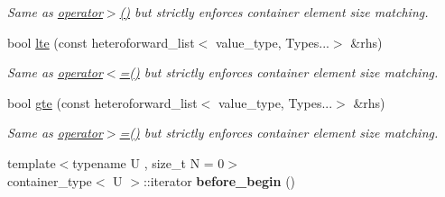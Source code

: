 \begin{DoxyCompactItemize}
\begin{DoxyCompactList}\small\item\em Same as \hyperlink{classheterogeneous_1_1heteroforward__list_3_01_t_00_01_types_8_8_8_4_a53105623b3fa15a69a755abb72d8d9e8}{operator$>$()} but strictly enforces container element size matching. \end{DoxyCompactList}\item 
\hypertarget{classheterogeneous_1_1heteroforward__list_3_01_t_00_01_types_8_8_8_4_a3f428c8009c489894a94a96668958e56}{}bool \hyperlink{classheterogeneous_1_1heteroforward__list_3_01_t_00_01_types_8_8_8_4_a3f428c8009c489894a94a96668958e56}{lte} (const heteroforward\+\_\+list$<$ value\+\_\+type, Types...$>$ \&rhs)\label{classheterogeneous_1_1heteroforward__list_3_01_t_00_01_types_8_8_8_4_a3f428c8009c489894a94a96668958e56}

\begin{DoxyCompactList}\small\item\em Same as \hyperlink{classheterogeneous_1_1heteroforward__list_3_01_t_00_01_types_8_8_8_4_aa99793464483ba0227a60a24757cb3e4}{operator$<$=()} but strictly enforces container element size matching. \end{DoxyCompactList}\item 
\hypertarget{classheterogeneous_1_1heteroforward__list_3_01_t_00_01_types_8_8_8_4_adc795fd11851f17efd8f6bab0b18b128}{}bool \hyperlink{classheterogeneous_1_1heteroforward__list_3_01_t_00_01_types_8_8_8_4_adc795fd11851f17efd8f6bab0b18b128}{gte} (const heteroforward\+\_\+list$<$ value\+\_\+type, Types...$>$ \&rhs)\label{classheterogeneous_1_1heteroforward__list_3_01_t_00_01_types_8_8_8_4_adc795fd11851f17efd8f6bab0b18b128}

\begin{DoxyCompactList}\small\item\em Same as \hyperlink{classheterogeneous_1_1heteroforward__list_3_01_t_00_01_types_8_8_8_4_aa4b61fd5871e58c3c19d9b6f32906d59}{operator$>$=()} but strictly enforces container element size matching. \end{DoxyCompactList}\item 
\hypertarget{classheterogeneous_1_1heteroforward__list_3_01_t_00_01_types_8_8_8_4_aa069232022c5481c9eb4931a0d5a7948}{}{\footnotesize template$<$typename U , size\+\_\+t N = 0$>$ }\\container\+\_\+type$<$ U $>$\+::iterator {\bfseries before\+\_\+begin} ()\label{classheterogeneous_1_1heteroforward__list_3_01_t_00_01_types_8_8_8_4_aa069232022c5481c9eb4931a0d5a7948}


\end{DoxyCompactItemize}
